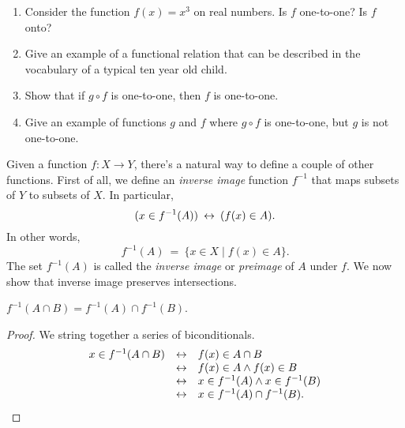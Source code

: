 

\begin{exercises} \mbox{} \begin{enumerate}
\item Consider the function $f(x)=x^3$ on real numbers.  Is
  $f$ one-to-one?  Is $f$ onto?
\item Give an example of a functional relation that can be described
  in the vocabulary of a typical ten year old child.
\item Show that if $g\circ f$ is one-to-one, then $f$ is one-to-one.
\item Give an example of functions $g$ and $f$ where $g\circ f$ is
  one-to-one, but $g$ is not one-to-one.  
\end{enumerate} \end{exercises}


Given a function $f:X\to Y$, there's a natural way to define a couple
of other functions.  First of all, we define an \emph{inverse image}
function $f^{-1}$ that maps subsets of $Y$ to subsets of $X$.  In
particular, 
\[ (x\in f^{-1}(A)) \: \leftrightarrow \: (f(x)\in A) . \]
In other words,
\[ f^{-1}(A) \: = \: \{ x\in X \mid f(x)\in A \} .\] The set
$f^{-1}(A)$ is called the \emph{inverse image} or \emph{preimage} of
$A$ under $f$.  We now show that inverse image preserves intersections.

\begin{prop} $f^{-1}(A\cap B)=f^{-1}(A)\cap f^{-1}(B)$.
\end{prop}

\begin{proof} We string together a series of biconditionals.
  \[ \begin{array}{l l l}
       x\in f^{-1}(A\cap B) & \leftrightarrow & f(x)\in A\cap B \\
                            & \leftrightarrow & f(x)\in A\wedge f(x)\in B \\
                            & \leftrightarrow & x\in f^{-1}(A)\wedge x\in f^{-1}(B) \\
       & \leftrightarrow & x\in f^{-1}(A)\cap
                f^{-1}(B) . \end{array} \] \end{proof}

